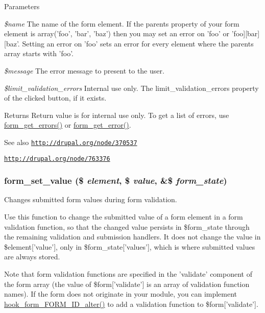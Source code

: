 \begin{DoxyParams}{Parameters}
\item[{\em \$name}]The name of the form element. If the parents property of your form element is array('foo', 'bar', 'baz') then you may set an error on 'foo' or 'foo\mbox{]}\mbox{[}bar\mbox{]}\mbox{[}baz'. Setting an error on 'foo' sets an error for every element where the parents array starts with 'foo'. \item[{\em \$message}]The error message to present to the user. \item[{\em \$limit\_\-validation\_\-errors}]Internal use only. The limit\_\-validation\_\-errors property of the clicked button, if it exists.\end{DoxyParams}
\begin{DoxyReturn}{Returns}
Return value is for internal use only. To get a list of errors, use \hyperlink{group__form__api_ga158b3db5e88e96bf060c524cebcb8130}{form\_\-get\_\-errors()} or \hyperlink{group__form__api_gae57581ad2406d61116a133b99142283b}{form\_\-get\_\-error()}.
\end{DoxyReturn}
\begin{DoxySeeAlso}{See also}
\href{http://drupal.org/node/370537}{\tt http://drupal.org/node/370537} 

\href{http://drupal.org/node/763376}{\tt http://drupal.org/node/763376} 
\end{DoxySeeAlso}
\hypertarget{group__form__api_ga2a377a1fcccea79d06d1a735dea433f3}{
\subsubsection[{form\_\-set\_\-value}]{\setlength{\rightskip}{0pt plus 5cm}form\_\-set\_\-value (\$ {\em element}, \/  \$ {\em value}, \/  \&\$ {\em form\_\-state})}}
\label{group__form__api_ga2a377a1fcccea79d06d1a735dea433f3}
Changes submitted form values during form validation.

Use this function to change the submitted value of a form element in a form validation function, so that the changed value persists in \$form\_\-state through the remaining validation and submission handlers. It does not change the value in \$element\mbox{[}'value'\mbox{]}, only in \$form\_\-state\mbox{[}'values'\mbox{]}, which is where submitted values are always stored.

Note that form validation functions are specified in the 'validate' component of the form array (the value of \$form\mbox{[}'validate'\mbox{]} is an array of validation function names). If the form does not originate in your module, you can implement \hyperlink{group__hooks_ga8d4a4089551493d55911bd5c4f218264}{hook\_\-form\_\-FORM\_\-ID\_\-alter()} to add a validation function to \$form\mbox{[}'validate'\mbox{]}.


